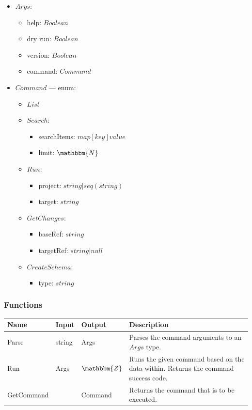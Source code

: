\documentclass[11pt]{article}
\begin{document}
\begin{itemize}
\item $Args$:
  \begin{itemize}
  \item help: $Boolean$
  \item dry run: $Boolean$
  \item version: $Boolean$
  \item command: $Command$
  \end{itemize}
\item $Command$ --- enum:
  \begin{itemize}
  \item $List$
  \item $Search$:
    \begin{itemize}
    \item searchItems: $map[key]value$

    \item limit: $\mathbbm{N}$
    \end{itemize}
  \item $Run$:
    \begin{itemize}
    \item project: $string | seq(string)$
    \item target: $string$
    \end{itemize}
  \item $GetChanges$:
    \begin{itemize}
    \item baseRef: $string$
    \item targetRef: $string | null$
    \end{itemize}
  \item $CreateSchema$:
    \begin{itemize}
      \item type: $string$
    \end{itemize}
  \end{itemize}
\end{itemize}

\subsubsection{Functions}

\begin{tabular}[h!]{l|l|l|p{6cm}}
  \textbf{Name} & \textbf{Input} & \textbf{Output} & \textbf{Description} \\
  \hline
  Parse & string & Args & Parses the command arguments to an $Args$ type.\\
  \hline
  Run & Args & $\mathbbm{Z}$ & Runs the given command based on the data within. Returns the command success code.\\
  \hline
  GetCommand & & Command & Returns the command that is to be executed.\\
\end{tabular}
\end{document}
